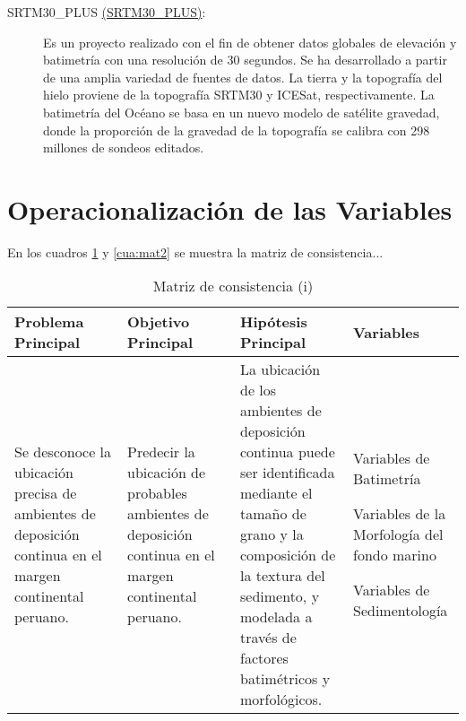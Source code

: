 \begin{description}
\item[SRTM30\_PLUS \href{http://topex.ucsd.edu/WWW_html/srtm30_plus.html}{(SRTM30\_PLUS)}:] Es un proyecto realizado con el fin de obtener datos globales de elevación y batimetría con una resolución de 30 segundos. Se ha desarrollado a partir de una amplia variedad de fuentes de datos. La tierra y la topografía del hielo proviene de la topografía SRTM30 y ICESat, respectivamente. La batimetría del Océano se basa en un nuevo modelo de satélite gravedad, donde la proporción de la gravedad de la topografía se calibra con 298 millones de sondeos editados.

\end{description}


\section{Operacionalización de las Variables}
\label{sec:variables}

En los cuadros \ref{cua:mat1} y \ref{cua:mat2} se muestra la matriz de consistencia...

\begin{table}[H]\footnotesize
\caption{Matriz de consistencia (i)}
\label{cua:mat1}
\centering
\begin{tabular}{ |p{0.25\linewidth}|p{0.25\linewidth}|p{0.25\linewidth}|p{0.25\linewidth}|}
\hline
\textbf{Problema Principal} & \textbf{Objetivo Principal} & \textbf{Hipótesis Principal} & \textbf{Variables}\\ \hline \hline
Se desconoce la ubicación precisa de ambientes de deposición continua en el margen continental peruano. & Predecir la ubicación de probables ambientes de deposición continua en el margen continental peruano. & La ubicación de los ambientes de deposición continua puede ser identificada mediante el tamaño de grano y la composición de la textura del sedimento, y modelada a través de factores batimétricos y morfológicos.  &
\begin{noindlist}
\item Variables de Batimetría
\item Variables de la Morfología del fondo marino
\item Variables de Sedimentología
\end{noindlist}\\ \hline
\end{tabular}
\end{table}


